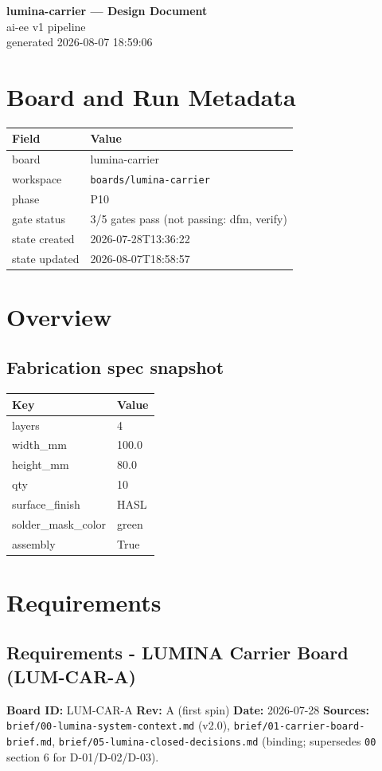 \documentclass[11pt,a4paper]{article}
\begin{document}
\sloppy
\begin{center}
{\LARGE\bfseries lumina-carrier --- Design Document}\\[6pt]
{\large ai-ee v1 pipeline}\\[2pt]
generated 2026-08-07 18:59:06
\end{center}
\tableofcontents

\section{Board and Run Metadata}
{\small
\begin{longtable}{lp{11cm}}
\toprule
\textbf{Field} & \textbf{Value} \\
\midrule
\endhead
board & lumina-carrier \\
workspace & \texttt{boards/lumina-carrier} \\
phase & P10 \\
gate status & 3/5 gates pass (not passing: dfm, verify) \\
state created & 2026-07-28T13:36:22 \\
state updated & 2026-08-07T18:58:57 \\
\bottomrule
\end{longtable}
}
\section{Overview}
\subsection*{Fabrication spec snapshot}
{\small
\begin{longtable}{ll}
\toprule
\textbf{Key} & \textbf{Value} \\
\midrule
\endhead
layers & 4 \\
width\_mm & 100.0 \\
height\_mm & 80.0 \\
qty & 10 \\
surface\_finish & HASL \\
solder\_mask\_color & green \\
assembly & True \\
\bottomrule
\end{longtable}
}
\section{Requirements}
\subsection*{Requirements - LUMINA Carrier Board (LUM-CAR-A)}
\textbf{Board ID:} LUM-CAR-A \textbar{} \textbf{Rev:} A (first spin) \textbar{} \textbf{Date:} 2026-07-28 \textbf{Sources:} \texttt{brief/00-lumina-system-context.md} (v2.0), \texttt{brief/01-carrier-board-brief.md}, \texttt{brief/05-lumina-closed-decisions.md} (binding; supersedes \texttt{00} section 6 for D-01/D-02/D-03).
\end{document}
